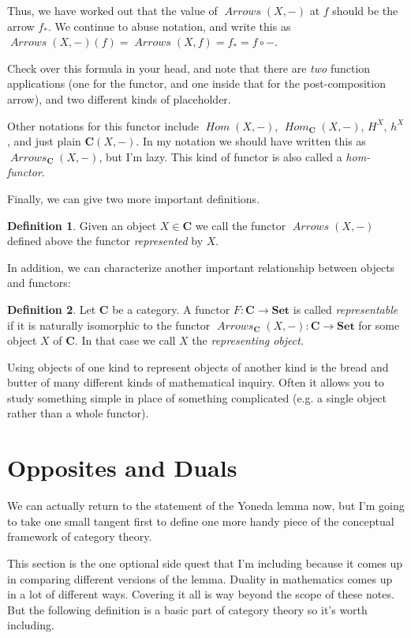\documentclass[12pt]{article}
\theoremstyle{definition}
\theoremstyle{definition}
\newtheorem{defn}{Definition}[]
\theoremstyle{definition}
\numberwithin{equation}{section}
\newcommand{\cat}[1]{\mathbf{#1}}      %
\newcommand{\fcat}[1]{{\mathbf {#1}}}    %
\newcommand{\CC}{\cat{C}}
\DeclareMathOperator{\Arrows}{\mathit{Arrows}}
\DeclareMathOperator{\Hom}{\mathit{Hom}}
\newcommand{\Set}{\fcat{Set}}           %
\def\ni{\goodbreak\noindent}
\begin{document}
Thus, we have worked out that the value of $\Arrows(X,-)$ at $f$ should be the arrow $f_*$.
We continue to abuse notation, and write this as
$\Arrows(X,-)(f) = \Arrows(X,f) = f_* = f \circ -$.

Check over this formula in your head, and note that 
there are {\it two} function applications (one for the functor, and one 
inside that for the post-composition arrow), 
and two different kinds of placeholder.

Other notations for this functor include $\Hom(X, -)$, $\Hom_\CC(X,
-)$, $H^X$, $h^X$, and just plain $\CC(X,-)$. 
In my notation we should have written this as
$\Arrows_{\CC}(X, -)$, but I'm lazy. This kind of functor is also called a {\it hom-functor}.

Finally, we can give two more important definitions.
\begin{defn}
\label{represented}
Given an object $X \in \CC$ we call the functor $\Arrows(X,-)$ defined above the functor {\it represented} by $X$.
\end{defn}
\ni
In addition, we can characterize another important relationship between
objects and functors:

\begin{defn}
 Let $\cat{C}$ be a category. A functor $F:\cat{C}\to\Set$ is called \emph{representable}
 if it is naturally isomorphic to the functor $\Arrows_\cat{C}(X,-):\cat{C}\to\Set$ for some
 object $X$ of $\cat{C}$. In that case we call $X$ the \emph{representing object}. 
\end{defn}
\ni
Using objects of one kind to represent objects of another kind is the bread and butter of many
different kinds of mathematical inquiry. Often it allows  you to study something simple in place
of something complicated (e.g. a single object rather than a whole functor).

\section{Opposites and Duals}

We can actually return to the statement of the Yoneda lemma now, but 
I'm going to take one small tangent first to define one more handy piece of
the conceptual framework of category theory.

This section is the one optional side quest that I'm including because it comes up in
comparing different versions of the lemma. Duality in mathematics comes up in a lot of
different ways. Covering it all is way beyond the scope of these notes. But the following
definition is a basic part of category theory so it's worth including.
\end{document}
